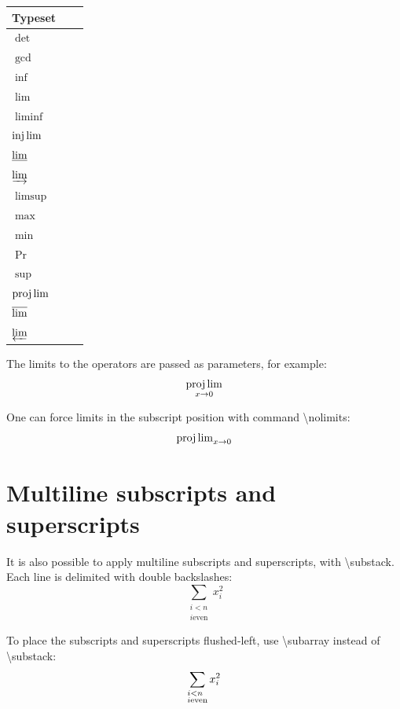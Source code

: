 \documentclass{sample}
\begin{document}
\begin{center}
	\begin{tabular}{llc}
	\toprule
	Typeset\\
	\midrule
	$\det$\\
	$\gcd$\\
	$\inf$\\
	$\lim$\\
	$\liminf$\\
	$\injlim$\\
	$\varliminf$\\
	$\varinjlim$\\
	$\limsup$\\
	$\max$\\
	$\min$\\
	$\Pr$\\
	$\sup$\\
	$\projlim$\\
	$\varlimsup$\\
	$\varprojlim$\\
	\bottomrule
	\end{tabular}
	\label{Ta:opsnolimit}
\end{center}

The limits to the operators are passed as parameters, for example:
\[
\projlim_{x \to 0}
\]

One can force limits in the subscript position with command \textbackslash nolimits:
\[
\projlim\nolimits_{x \to 0}
\]

\section{Multiline subscripts and superscripts}
It is also possible to apply multiline subscripts and superscripts, with \textbackslash substack. Each line is delimited with double backslashes:
\[
\sum_{\substack{i < n\\i \text{even}}}x_{i}^2
\]

To place the subscripts and superscripts flushed-left, use \textbackslash subarray instead of \textbackslash substack:
\[
\sum_{
\begin{subarray}{1}
i < n\\i \text{even}
\end{subarray}}
x_{i}^2
\]
\newpage
\end{document}

